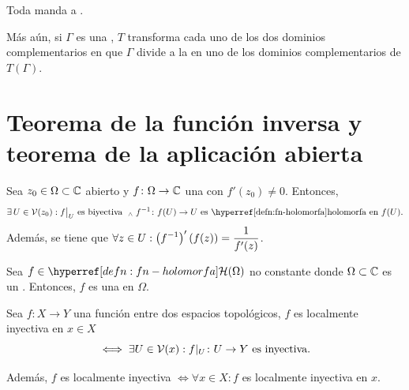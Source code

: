 \begin{teo}\label{teo:transformacion-mobius-circunferencias-generalizadas}
    Toda  manda  a . 

    Más aún, si $\Gamma$ es una , $T$ transforma cada uno de los dos dominios complementarios en que $\Gamma$ divide a la  en uno de los dominios complementarios de $T(\Gamma)$.
\end{teo}

\section{Teorema de la función inversa y teorema de la aplicación abierta}

\begin{teo}\label{teo:fn-inversa-holomorfas}
    Sea $z_0 \in \Omega \subset \mathbb{C}$ abierto y $f \colon \Omega \to \mathbb{C}$ una  con $f'(z_0) \neq 0$. Entonces,
    \[
    \exists \, U \in \mathcal{V}(z_0) : f\big|_{U} \tex{ es biyectiva } \we \appl{f^{-1}}{f(U)}{U} \tex{ es \exhyperref[defn:fn-holomorfa]{fn-holomorfa}{holomorfa en $f(U)$}}.
    \]
    Además, se tiene que $\displaystyle \forall z \in U : \left(f^{-1}\right)'(f(z)) = \frac{1}{f'(z)}$.
\end{teo}

\begin{teo}\label{teo:apl-abierta-compleja}
    Sea $f \in \exhyperref[defn:fn-holomorfa]{fn-holomorfa}{\mathcal{H}}(\Omega)$  no constante donde $\Omega\subset \mathbb{C}$ es un . Entonces, $f$ es una  en $\Omega$.
\end{teo}

\begin{defn}\label{defn:inyectividad-local}
    Sea $f \colon X \to Y$ una función entre dos espacios topológicos, $f$ es localmente inyectiva en $x \in X$ 
    \[
        \iff \exists U \in \mathcal{V}(x) : f|_U \colon U \to Y \text{ es inyectiva}.
    \]

    Además, $f$ es localmente inyectiva $\iff \forall x \in X : f$ es localmente inyectiva en $x$.
\end{defn}

